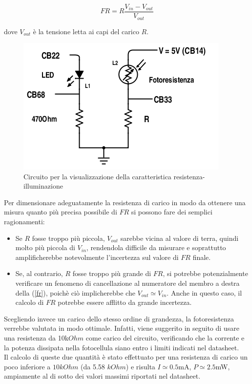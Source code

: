 \documentclass[journal, a4paper]{IEEEtran}
\begin{document}
\begin{equation}\label{fr}
FR = R \frac{V_{in}-V_{out}}{V_{out}}
\end{equation}

dove $V_{out}$ è la tensione letta ai capi del carico $R$.

\begin{figure}
\centering
\includegraphics[width=0.8\linewidth]{./es23-week06}
\caption{Circuito per la visualizzazione della caratteristica resistenza-illuminazione}
\label{fig:es23-week06}
\end{figure}


Per dimensionare adeguatamente la resistenza di carico in modo da ottenere una misura quanto più precisa possibile di $FR$ si possono fare dei semplici ragionamenti:

\begin{itemize}
\item Se $R$ fosse troppo più piccola, $V_{out}$ sarebbe vicina al valore di terra, quindi molto più piccola di $V_{in}$, rendendola difficile da misurare e soprattutto amplificherebbe notevolmente l'incertezza sul valore di $FR$ finale.

\item Se, al contrario, $R$ fosse troppo più grande di $FR$, si potrebbe potenzialmente verificare un fenomeno di cancellazione al numeratore del membro a destra della (\ref{fr}), poichè ciò implicherebbe che $V_{out} \simeq V_{in}$. Anche in questo caso, il calcolo di $FR$ potrebbe essere afflitto da grande incertezza.


\end{itemize}

Scegliendo invece un carico dello stesso ordine di grandezza, la fotoresistenza verrebbe valutata in modo ottimale. Infatti, viene suggerito in seguito di usare una resistenza da 10k$\si{Ohm}$ come carico del circuito, verificando che la corrente e la potenza dissipata nella fotocellula siano entro i limiti indicati nel datasheet.\\
Il calcolo di queste due quantità è stato effettuato per una resistenza di carico un poco inferiore a $10 \si{kOhm}$ (da 5.58 $\si{kOhm}$) e risulta $I \simeq 0.5$mA, $P \simeq 2.5$mW, ampiamente al di sotto dei valori massimi riportati nel datasheet.
\end{document}
